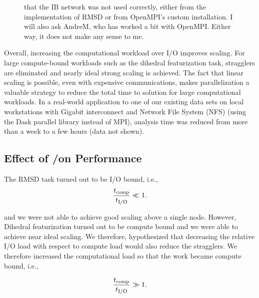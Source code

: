 \begin{figure}[ht!]
{  that the IB network was not used correctly, either from the implementation of RMSD or from OpenMPI's custom installation. I will also ask AndreM, who has worked a bit with OpenMPI. Either way, it does not make any sense to me.}
\label{fig:comparison-t_comm-dihedral}
\end{figure}

Overall, increasing the computational workload over I/O improves scaling. For large compute-bound workloads such as the dihedral
featurization task, stragglers are eliminated and nearly ideal strong scaling is achieved. 
The fact that linear scaling is possible, even with expensive communications, makes parallelization a valuable strategy to reduce
the total time to solution for large computational workloads. In a real-world application to one of our existing data sets on local
workstations with Gigabit interconnect and Network File System (NFS) (using the Dask parallel library instead of MPI), analysis time was reduced from more
than a week to a few hours (data not shown).

\subsection{Effect of \tcomp/\tIO on Performance}
\label{bound}

The RMSD task turned out to be I/O bound, i.e.,
\begin{gather*}
  \frac{{t}_{\text{comp}}}{{t}_{\text{I/O}}} \ll 1.
\end{gather*}

and we were not able to achieve good scaling above a single node. 
However, Dihedral featurization turned out to be compute bound and we were able to achieve near ideal scaling. 
We therefore, hypothesized that decreasing the relative I/O load with respect to compute load would also reduce the stragglers. 
We therefore increased the computational load so that the work became compute bound, i.e.,

\begin{gather*}
  \frac{{t}_{\text{comp}}}{{t}_{\text{I/O}}} \gg 1.
\end{gather*}

